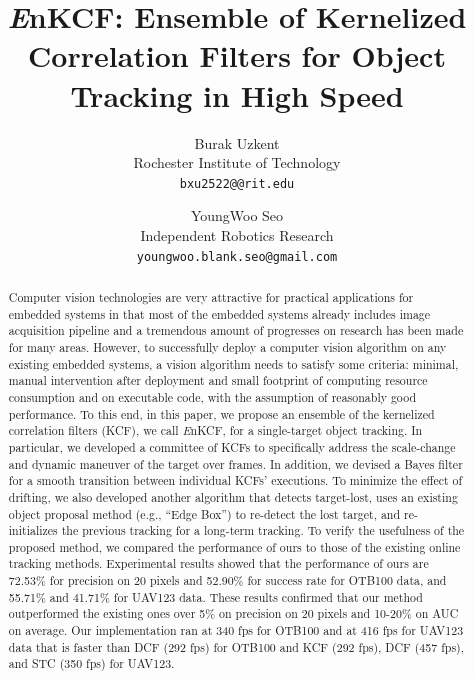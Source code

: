 \documentclass[10pt,twocolumn,letterpaper]{article}
\newcounter{ct}
\begin{document}
\title{ {\it E}nKCF: Ensemble of Kernelized Correlation Filters for Object Tracking in High Speed}

\author{Burak Uzkent\\
Rochester Institute of Technology\\
{\tt\small bxu2522@@rit.edu}
\and
YoungWoo Seo\\
Independent Robotics Research\\
{\tt\small youngwoo.blank.seo@gmail.com}
}

\maketitle

\begin{abstract}
Computer vision technologies are very attractive for practical
applications for embedded systems in that most of the embedded systems
already includes image acquisition pipeline and a tremendous amount of
progresses on research has been made for many areas. However, to
successfully deploy a computer vision algorithm on any existing
embedded systems, a vision algorithm needs to satisfy some criteria:
minimal, manual intervention after deployment and small footprint of
computing resource consumption and on executable code, with the
assumption of reasonably good performance. To this end, in this paper,
we propose an ensemble of the kernelized correlation filters (KCF), we
call {\it E}nKCF, for a single-target object tracking. In particular,
we developed a committee of KCFs to specifically address the
scale-change and dynamic maneuver of the target over frames. In
addition, we devised a Bayes filter for a smooth transition between
individual KCFs' executions. To minimize the effect of drifting, we
also developed another algorithm that detects target-lost, uses an
existing object proposal method (e.g., ``Edge Box'') to re-detect the
lost target, and re-initializes the previous tracking for a long-term
tracking. To verify the usefulness of the proposed method, we compared
the performance of ours to those of the existing online tracking
methods. Experimental results showed that the performance of ours are
72.53\% for precision on 20 pixels and 52.90\% for success rate for
OTB100 data, and 55.71\% and 41.71\% for UAV123 data. These results
confirmed that our method outperformed the existing ones over 5\% on
precision on 20 pixels and 10-20\% on AUC on average. Our
implementation ran at 340 fps for OTB100 and at 416 fps for UAV123
data that is faster than DCF (292 fps) for OTB100 and KCF (292 fps),
DCF (457 fps), and STC (350 fps) for UAV123.
\end{abstract}
\end{document}
